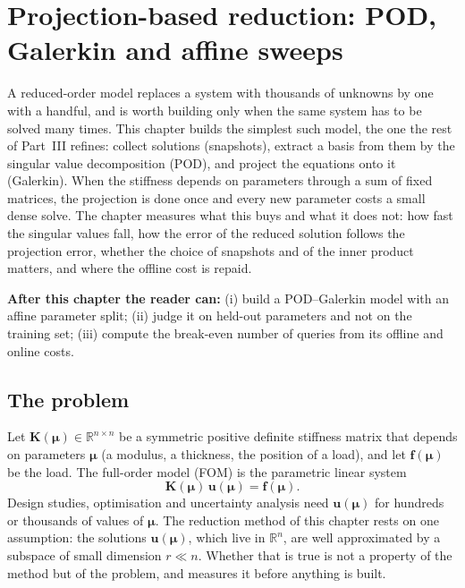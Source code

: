 \chapter{Projection-based reduction: POD, Galerkin and affine sweeps}\label{ch:pod}

\begin{tcolorbox}[colback=gray!5,colframe=gray!50,title={In this chapter}]
A reduced-order model replaces a system with thousands of unknowns by one with a handful, and is worth building only when the same system has to be solved many times. This chapter builds the simplest such model, the one the rest of Part~III refines: collect solutions (snapshots), extract a basis from them by the singular value decomposition (POD), and project the equations onto it (Galerkin). When the stiffness depends on parameters through a sum of fixed matrices, the projection is done once and every new parameter costs a small dense solve. The chapter measures what this buys and what it does not: how fast the singular values fall, how the error of the reduced solution follows the projection error, whether the choice of snapshots and of the inner product matters, and where the offline cost is repaid.\par\smallskip
\textbf{After this chapter the reader can:} (i) build a POD--Galerkin model with an affine parameter split; (ii) judge it on held-out parameters and not on the training set; (iii) compute the break-even number of queries from its offline and online costs.
\end{tcolorbox}

\section{The problem}\label{sec:pod-problem}

Let $\bm K(\bm\mu)\in\mathbb R^{n\times n}$ be a symmetric positive definite stiffness matrix that depends on parameters $\bm\mu$ (a modulus, a thickness, the position of a load), and let $\bm f(\bm\mu)$ be the load. The full-order model (FOM) is the parametric linear system
\begin{equation}\label{eq:pod-fom}
\bm K(\bm\mu)\,\bm u(\bm\mu)=\bm f(\bm\mu).
\end{equation}
Design studies, optimisation and uncertainty analysis need $\bm u(\bm\mu)$ for hundreds or thousands of values of $\bm\mu$. The reduction method of this chapter rests on one assumption: the solutions $\bm u(\bm\mu)$, which live in $\mathbb R^n$, are well approximated by a subspace of small dimension $r\ll n$. Whether that is true is not a property of the method but of the problem, and  measures it before anything is built.

